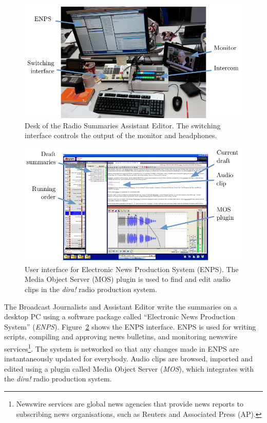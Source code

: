 \begin{figure}
  \centering
  \includegraphics[width=\columnwidth]{figs/news-desk-labelled.pdf}
  \caption{Desk of the Radio Summaries Assistant Editor. The switching interface controls the output of the monitor and
    headphones.}
  \label{fig:news-desktop}
\end{figure}

\begin{figure}
  \centering
  \includegraphics[width=\columnwidth]{figs/news-enps-labelled.pdf}
  \caption{User interface for Electronic News Production System (ENPS). The Media Object Server (MOS) plugin is used to
  find and edit audio clips in the \textit{dira!} radio production system.}
  \label{fig:news-enps-edit}
\end{figure}

The Broadcast Journalists and Assistant Editor write the summaries on a desktop PC using a software package called
``Electronic News Production System'' (\textit{ENPS}). Figure~\ref{fig:news-enps-edit} shows the ENPS interface. ENPS
is used for writing scripts, compiling and approving news bulletins, and monitoring newswire services\footnote{Newswire
services are global news agencies that provide news reports to subscribing news organisations, such as Reuters and
Associated Press (AP).}. The system is networked so that any changes made in ENPS are instantaneously updated for
everybody. Audio clips are browsed, imported and edited using a plugin called Media Object Server (\textit{MOS}), which
integrates with the \textit{dira!} radio production system.

